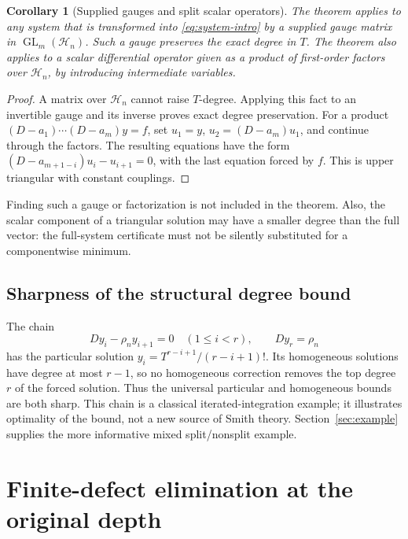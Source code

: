 \documentclass[11pt,a4paper]{article}
\numberwithin{equation}{section}
\newtheorem{corollary}[theorem]{Corollary}
\theoremstyle{definition}
\theoremstyle{remark}\newtheorem{remark}[theorem]{Remark}
\newcommand{\Hh}{\mathcal H}\newcommand{\Ll}{\mathcal L}
\begin{document}
\begin{corollary}[Supplied gauges and split scalar operators]
\label{cor:gauge}
The theorem applies to any system that is transformed into \eqref{eq:system-intro} by a supplied gauge matrix in $\operatorname{GL}_m(\Hh_n)$. Such a gauge preserves the exact degree in $T$. The theorem also applies to a scalar differential operator given as a product of first-order factors over $\Hh_n$, by introducing intermediate variables.
\end{corollary}
\begin{proof}
A matrix over $\Hh_n$ cannot raise $T$-degree. Applying this fact to an invertible gauge and its inverse proves exact degree preservation. For a product $(D-a_1)\cdots(D-a_m)y=f$, set $u_1=y$, $u_2=(D-a_m)u_1$, and continue through the factors. The resulting equations have the form $(D-a_{m+1-i})u_i-u_{i+1}=0$, with the last equation forced by $f$. This is upper triangular with constant couplings.
\end{proof}

Finding such a gauge or factorization is not included in the theorem. Also, the scalar component of a triangular solution may have a smaller degree than the full vector: the full-system certificate must not be silently substituted for a componentwise minimum.

\subsection{Sharpness of the structural degree bound}
The chain
\[
 Dy_i-\rho_n y_{i+1}=0\quad(1\le i<r),
 \qquad Dy_r=\rho_n
\]
has the particular solution $y_i=T^{r-i+1}/(r-i+1)!$. Its homogeneous solutions have degree at most $r-1$, so no homogeneous correction removes the top degree $r$ of the forced solution. Thus the universal particular and homogeneous bounds are both sharp. This chain is a classical iterated-integration example; it illustrates optimality of the bound, not a new source of Smith theory. Section~\ref{sec:example} supplies the more informative mixed split/nonsplit example.

\section{Finite-defect elimination at the original depth}
\label{sec:fixed}
\end{document}
